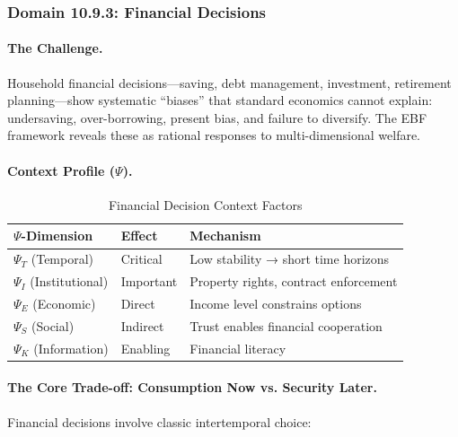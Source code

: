 \subsubsection{Domain 10.9.3: Financial Decisions}
\label{subsubsec:financial-decisions}

\paragraph{The Challenge.}
Household financial decisions---saving, debt management, investment, retirement
planning---show systematic ``biases'' that standard economics cannot explain:
undersaving, over-borrowing, present bias, and failure to diversify. The EBF
framework reveals these as rational responses to multi-dimensional welfare.

\paragraph{Context Profile ($\Psi$).}

\begin{table}[htbp]
\centering
\caption{Financial Decision Context Factors}
\label{tab:finance-psi}
\renewcommand{\arraystretch}{1.3}
\begin{tabular}{@{}lll@{}}
\toprule
\textbf{$\Psi$-Dimension} & \textbf{Effect} & \textbf{Mechanism} \\
\midrule
$\Psi_T$ (Temporal) & Critical & Low stability → short time horizons \\
$\Psi_I$ (Institutional) & Important & Property rights, contract enforcement \\
$\Psi_E$ (Economic) & Direct & Income level constrains options \\
$\Psi_S$ (Social) & Indirect & Trust enables financial cooperation \\
$\Psi_K$ (Information) & Enabling & Financial literacy \\
\bottomrule
\end{tabular}
\end{table}

\paragraph{The Core Trade-off: Consumption Now vs. Security Later.}
Financial decisions involve classic intertemporal choice:

